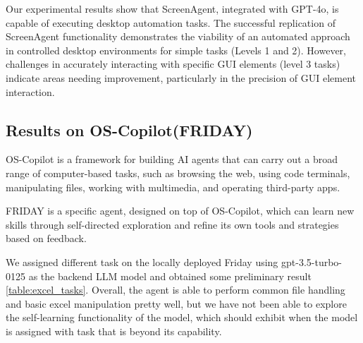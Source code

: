 \documentclass[11pt,letterpaper]{article}
\begin{document}
\vspace{10pt}

\noindent Our experimental results show that ScreenAgent, integrated with GPT-4o, is capable of executing desktop automation tasks. The successful replication of ScreenAgent functionality demonstrates the viability of an automated approach in controlled desktop environments for simple tasks (Levels 1 and 2). However, challenges in accurately interacting with specific GUI elements (level 3 tasks) indicate areas needing improvement, particularly in the precision of GUI element interaction.

\subsection{Results on OS-Copilot(FRIDAY)}
OS-Copilot is a framework for building AI agents that can carry out a broad range of computer-based tasks, such as browsing the web, using code terminals, manipulating files, working with multimedia, and operating third-party apps. 

\vspace{10pt}

\noindent FRIDAY is a specific agent, designed on top of OS-Copilot, which can learn new skills through self-directed exploration and refine its own tools and strategies based on feedback. 

\vspace{10pt}

\noindent We assigned different task on the locally deployed Friday using gpt-3.5-turbo-0125 as the backend LLM model and obtained some preliminary result \ref{table:excel_tasks}. Overall, the agent is able to perform common file handling and basic excel manipulation pretty well, but we have not been able to explore the self-learning functionality of the model, which should exhibit when the model is assigned with task that is beyond its capability.

\vspace{10pt}


\end{document}
